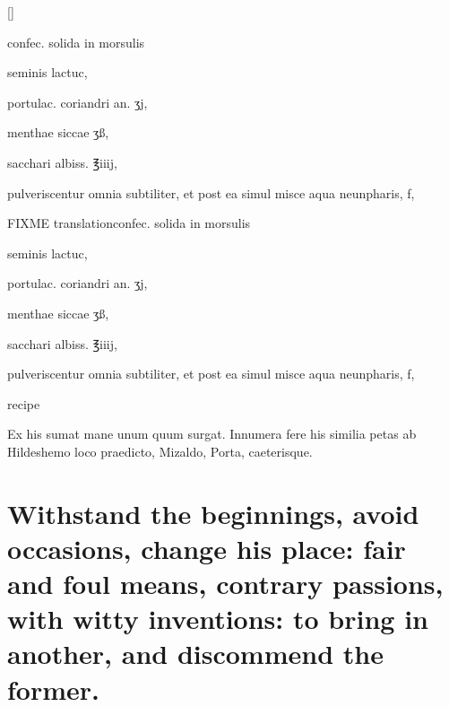 \begin{Prescription}[H]
[\baselineskip]
\begin{prescriptionbox}{}{\textlatin{confec. solida in morsulis}}
\item \textlatin{seminis lactuc},
\item \textlatin{portulac. coriandri an. ʒj},
\item \textlatin{menthae siccae ʒß},
\item \textlatin{sacchari albiss. ℥iiij},
\item \textlatin{pulveriscentur omnia subtiliter, et post ea simul misce aqua neunpharis, f},
\end{prescriptionbox}
\begin{prescriptionbox}{FIXME translation}{\textlatin{confec. solida in morsulis}}
\item \textlatin{seminis lactuc},
\item \textlatin{portulac. coriandri an. ʒj},
\item \textlatin{menthae siccae ʒß},
\item \textlatin{sacchari albiss. ℥iiij},
\item \textlatin{pulveriscentur omnia subtiliter, et post ea simul misce aqua neunpharis, f},
\end{prescriptionbox}
\caption{ recipe}
\end{Prescription}

Ex his sumat mane unum quum
surgat. Innumera fere his similia petas ab Hildeshemo loco praedicto,
Mizaldo, Porta, caeterisque.

\section[Withstand the beginnings, avoid occasions of love]{Withstand the beginnings, avoid occasions, change his place: fair and foul means, contrary passions, with witty inventions: to bring in another, and discommend the former.}

